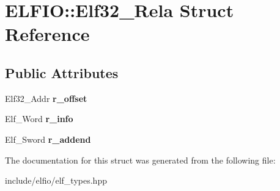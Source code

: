\hypertarget{struct_e_l_f_i_o_1_1_elf32___rela}{}\section{E\+L\+F\+IO\+:\+:Elf32\+\_\+\+Rela Struct Reference}
\label{struct_e_l_f_i_o_1_1_elf32___rela}
\subsection*{Public Attributes}
\begin{DoxyCompactItemize}
\item 
Elf32\+\_\+\+Addr {\bfseries r\+\_\+offset}\hypertarget{struct_e_l_f_i_o_1_1_elf32___rela_ac74bf3e216911ee45a5796e767c3e22c}{}\label{struct_e_l_f_i_o_1_1_elf32___rela_ac74bf3e216911ee45a5796e767c3e22c}

\item 
Elf\+\_\+\+Word {\bfseries r\+\_\+info}\hypertarget{struct_e_l_f_i_o_1_1_elf32___rela_a6f129cab51c003ba4fee4bac7c936376}{}\label{struct_e_l_f_i_o_1_1_elf32___rela_a6f129cab51c003ba4fee4bac7c936376}

\item 
Elf\+\_\+\+Sword {\bfseries r\+\_\+addend}\hypertarget{struct_e_l_f_i_o_1_1_elf32___rela_a5ed8955579209e74b133aa9a0c0bdccb}{}\label{struct_e_l_f_i_o_1_1_elf32___rela_a5ed8955579209e74b133aa9a0c0bdccb}

\end{DoxyCompactItemize}


The documentation for this struct was generated from the following file\+:\begin{DoxyCompactItemize}
\item 
include/elfio/elf\+\_\+types.\+hpp\end{DoxyCompactItemize}
